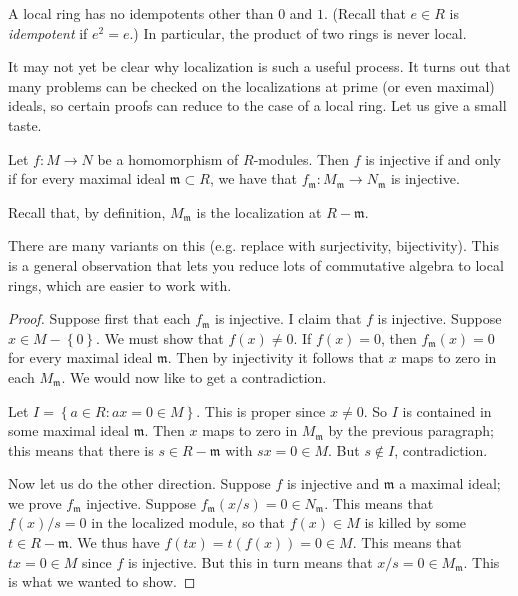 \begin{exercise} 
A local ring has no idempotents other than $0$ and $1$. (Recall that $e \in R$
is \emph{idempotent} if $e^2 = e$.) In particular, the product of two rings is
never local. 
\end{exercise} 

It may not yet be clear why localization is such a useful process. It turns
out that many problems can be checked on the localizations at prime (or even
maximal) ideals, so certain proofs can reduce to the case of a local ring.  Let us give a small taste.

\begin{proposition} 
Let $f: M \to N$ be a homomorphism of $R$-modules.  Then $f$ is injective if
and only if for every maximal ideal $\mathfrak{m} \subset R$, we have that
$f_{\mathfrak{m}}: M_{\mathfrak{m}} \to N_{\mathfrak{m}}$ is injective.  
\end{proposition} 
Recall that, by definition, $M_{\mathfrak{m}}$ is the localization at $R - \mathfrak{m}$.

There are many variants on this (e.g. replace with surjectivity, bijectivity).
This is a general observation that lets you reduce lots of commutative algebra
to local rings, which are easier to work with.

\begin{proof} 
Suppose first that each $f_{\mathfrak{m}}$ is injective.  I claim that $f$ is
injective.  Suppose $x \in M - \left\{0\right\}$. We must show that $f(x) \neq
0$. If $f(x)=0$, then $f_{\mathfrak{m}}(x)=0$ for every maximal ideal
$\mathfrak{m}$.  Then by
injectivity it follows that $x$ maps to zero in each $M_{\mathfrak{m}}$.
We would now like to get a contradiction.

Let $I = \left\{ a \in R: ax = 0 \in M \right\}$.  This is proper since $x \neq
0$.  So $I$ is contained in some maximal ideal $\mathfrak{m}$.  Then $x$ 
maps to zero in $M_{\mathfrak{m}}$ by the previous paragraph; this means that
there is $s \in R - \mathfrak{m}$ with $sx = 0 \in M$. But $s \notin I$,
contradiction.  

Now let us do the other direction. Suppose $f$ is injective and $\mathfrak{m}$
a maximal ideal; we prove $f_{\mathfrak{m}}$ injective.  Suppose
$f_{\mathfrak{m}}(x/s)=0 \in N_{\mathfrak{m}}$. This means that $f(x)/s=0$ in
the localized module, so that $f(x) \in M$ is killed by some $t \in R -
\mathfrak{m}$.  We thus have $f(tx) = t(f(x)) = 0 \in M$.  This means that $tx
= 0 \in M$ since $f$ is injective. But this in turn means that $x/s = 0 \in
M_{\mathfrak{m}}$. This is what we wanted to show. 
\end{proof} 



